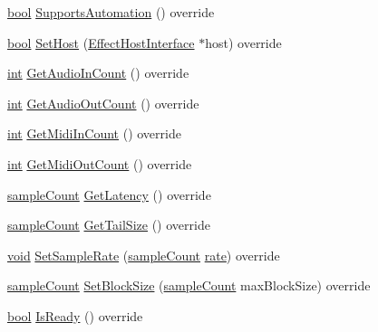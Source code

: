 \begin{DoxyCompactItemize}
\item 
\hyperlink{mac_2config_2i386_2lib-src_2libsoxr_2soxr-config_8h_abb452686968e48b67397da5f97445f5b}{bool} \hyperlink{class_effect_a5c6ca49a5d28b5044a74aac5d93fe19b}{Supports\+Automation} () override
\item 
\hyperlink{mac_2config_2i386_2lib-src_2libsoxr_2soxr-config_8h_abb452686968e48b67397da5f97445f5b}{bool} \hyperlink{class_effect_a62cd358c98ac35e95dc7eafad8c90cf1}{Set\+Host} (\hyperlink{class_effect_host_interface}{Effect\+Host\+Interface} $\ast$host) override
\item 
\hyperlink{xmltok_8h_a5a0d4a5641ce434f1d23533f2b2e6653}{int} \hyperlink{class_effect_a2e27ba0d20d3751f06bf21832146782e}{Get\+Audio\+In\+Count} () override
\item 
\hyperlink{xmltok_8h_a5a0d4a5641ce434f1d23533f2b2e6653}{int} \hyperlink{class_effect_a24c706f55d14d7e4b17d6b5c4b4b41bf}{Get\+Audio\+Out\+Count} () override
\item 
\hyperlink{xmltok_8h_a5a0d4a5641ce434f1d23533f2b2e6653}{int} \hyperlink{class_effect_acbe76f99e565671042f3794dfbd596b7}{Get\+Midi\+In\+Count} () override
\item 
\hyperlink{xmltok_8h_a5a0d4a5641ce434f1d23533f2b2e6653}{int} \hyperlink{class_effect_a42c2a4baa8459966b9af897c733a94c9}{Get\+Midi\+Out\+Count} () override
\item 
\hyperlink{include_2audacity_2_types_8h_afa427e1f521ea5ec12d054e8bd4d0f71}{sample\+Count} \hyperlink{class_effect_a2804ef350561e2df032186e069edc367}{Get\+Latency} () override
\item 
\hyperlink{include_2audacity_2_types_8h_afa427e1f521ea5ec12d054e8bd4d0f71}{sample\+Count} \hyperlink{class_effect_a27b44d4eba85018d3f386a6851a49ff3}{Get\+Tail\+Size} () override
\item 
\hyperlink{sound_8c_ae35f5844602719cf66324f4de2a658b3}{void} \hyperlink{class_effect_a1b7f45f24b136008ff6d9401178a8f11}{Set\+Sample\+Rate} (\hyperlink{include_2audacity_2_types_8h_afa427e1f521ea5ec12d054e8bd4d0f71}{sample\+Count} \hyperlink{seqread_8c_ad89d3fac2deab7a9cf6cfc8d15341b85}{rate}) override
\item 
\hyperlink{include_2audacity_2_types_8h_afa427e1f521ea5ec12d054e8bd4d0f71}{sample\+Count} \hyperlink{class_effect_a1507349ad41e4824392b8865644485c8}{Set\+Block\+Size} (\hyperlink{include_2audacity_2_types_8h_afa427e1f521ea5ec12d054e8bd4d0f71}{sample\+Count} max\+Block\+Size) override
\item 
\hyperlink{mac_2config_2i386_2lib-src_2libsoxr_2soxr-config_8h_abb452686968e48b67397da5f97445f5b}{bool} \hyperlink{class_effect_a5f822fe541d68de5b0091b72f1f22aae}{Is\+Ready} () override

\end{DoxyCompactItemize}
